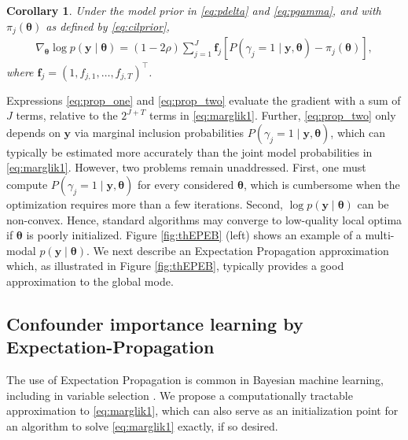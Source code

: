 \documentclass[12pt]{article}
\newcommand{\mb}[1]{\mathbf{#1}}
\newcommand{\tr}[1]{#1^{\intercal}}
\newcommand{\by}{{\mb{y}}}
\newcommand{\btheta}{{\bm{\theta}}}
\newcommand{\bthetaeb}{\btheta^{\textsc{eb}}}
\newtheorem{corollary}[thm]{Corollary}
\newcommand{\omcom}[1]{ {\color{blue} #1} }
\begin{document}
\begin{corollary} \label{prop:two}
Under the model prior in \eqref{eq:pdelta} and \eqref{eq:pgamma}, and with $\pi_{j}(\btheta)$ as defined by \eqref{eq:cilprior},
\begin{align}
\nabla_{\btheta} \log p(\by \mid \btheta) = (1-2\rho) \sum_{j=1}^{J} \mb{f}_{j} \left[P(\gamma_{j} = 1 \mid \by, \btheta) - \pi_{j}(\btheta)\right], \label{eq:prop_two}
\end{align}
where $\mb{f}_{j} = \tr{(1, f_{j,1}, \dots, f_{j,T})}$.
\end{corollary}
Expressions \eqref{eq:prop_one} and \eqref{eq:prop_two} evaluate the gradient with a sum of $J$ terms, relative to the $2^{J+T}$ terms in \eqref{eq:marglik1}. Further, \eqref{eq:prop_two} only depends on $\by$ via marginal inclusion probabilities $P(\gamma_j = 1 \mid \by, \btheta)$, which can typically be estimated more accurately than the joint model probabilities in \eqref{eq:marglik1}. 
However, two problems remain unaddressed. First, one must compute $P(\gamma_j = 1 \mid \by, \btheta)$ for every considered $\btheta$, which is cumbersome when the optimization requires more than a few iterations. Second, $\log p(\by \mid \btheta)$ can be non-convex. Hence, standard algorithms may converge to low-quality local optima if $\btheta$ is poorly initialized. Figure \ref{fig:thEPEB} (left) shows an example of a multi-modal $p(\by \mid \btheta)$.
We next describe an Expectation Propagation approximation which, as illustrated in Figure \ref{fig:thEPEB}, typically provides a good approximation to the global mode.



\subsection{Confounder importance learning by Expectation-Propagation}
\label{sec:ep}

The use of Expectation Propagation \citep{Minka01a, Minka01b} is common in Bayesian machine learning, including in variable selection \citep{Seeger07, HdezLobato13, Xu14}. 
We propose a computationally tractable approximation to \eqref{eq:marglik1}, which can also serve as an initialization point for an algorithm to solve \eqref{eq:marglik1} exactly, if so desired.
\end{document}
